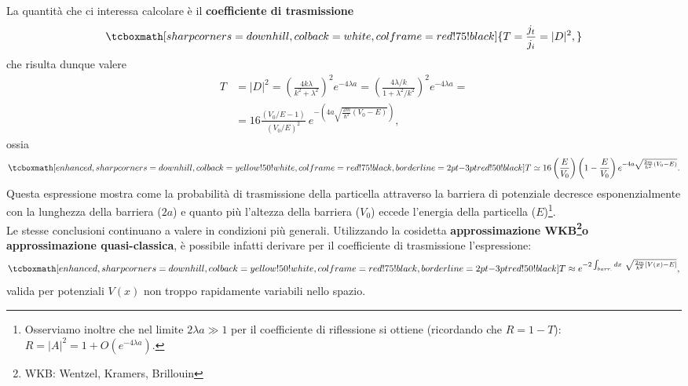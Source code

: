 \documentclass[a4paper,12pt,oneside]{book}
\begin{document}
La quantità che ci interessa calcolare è il \textbf{coefficiente di trasmissione}
	\begin{equation}
		\tcboxmath[sharp corners=downhill, colback=white, colframe=red!75!black]{
			T=\frac{j_t}{j_i}=|D|^2,
			}
	\end{equation}
che risulta dunque valere
	\begin{align}
		T &= |D|^2= \left(\frac{4k\lambda}{k^2+\lambda ^2} \right) ^2 e^{-4\lambda a} =\left(\frac{4\lambda /k}{1+\lambda ^2/k^2} \right) ^2 e^{-4\lambda a}= \nonumber \\[0.3cm]
		&=16\frac{\left(V_0 /E-1\right)}{\left(V_0 /E \right) ^2}\ e^{-\left(4a\sqrt{\frac{2m}{\hbar ^2}\left(V_0-E\right)}\right)},
	\end{align}
ossia
	\begin{equation}
		\tcboxmath[enhanced, sharp corners=downhill, colback=yellow!50!white, colframe=red!75!black, borderline={2pt}{-3pt}{red!50!black}]{
			T \simeq 16 \left(\frac{E}{V_0} \right) \left(1-\frac{E}{V_0}\right) e^{-4a\sqrt{\frac{2m}{\hbar ^2}\left(V_0-E\right)}}.
			}
	\end{equation}
Questa espressione mostra come la probabilità di trasmissione della particella attraverso la barriera di potenziale decresce esponenzialmente con la lunghezza della barriera ($2a$) e quanto più l'altezza della barriera ($V_0$) eccede l'energia della particella ($E$)\footnote{Osserviamo inoltre che nel limite $2\lambda a \gg 1 $ per il coefficiente di riflessione si ottiene (ricordando che $R=1-T$): $
 R=|A|^2=1+O(e^{-4\lambda a})$.}.\\

Le stesse conclusioni continuano a valere in condizioni più generali. Utilizzando la cosidetta \textbf{approssimazione WKB\footnote{WKB: Wentzel, Kramers, Brillouin}o approssimazione quasi-classica}, è possibile infatti derivare per il coefficiente di trasmissione l'espressione:
	\begin{equation}
		\tcboxmath[enhanced, sharp corners=downhill, colback=yellow!50!white, colframe=red!75!black, borderline={2pt}{-3pt}{red!50!black}]{
			T \approx e^{-2 \int_{barr.} dx\ \sqrt{\frac{2m}{\hbar ^2}\left[ V(x)-E \right]}},
			}
		 \end{equation}
valida per potenziali $V(x)$ non troppo rapidamente variabili nello spazio.\\
\end{document}
